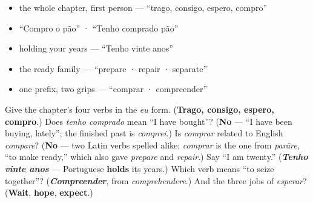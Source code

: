 \begin{itemize}
\raggedright
  \item the whole chapter, first person — \textquotedblleft{}trago, consigo, espero, compro\textquotedblright{}
  \item \textquotedblleft{}Compro o pão\textquotedblright{} · \textquotedblleft{}Tenho comprado pão\textquotedblright{}
  \item holding your years — \textquotedblleft{}Tenho vinte anos\textquotedblright{}
  \item the ready family — \textquotedblleft{}prepare · repair · separate\textquotedblright{}
  \item one prefix, two grips — \textquotedblleft{}comprar · compreender\textquotedblright{}
\end{itemize}

\begin{tcolorbox}[breakable,colback=teal!4,colframe=teal!35!black,title={Before you move on}]
Give the chapter's four verbs in the \emph{eu} form. (\textbf{Trago, consigo, espero, compro}.) Does \emph{tenho comprado} mean \textquotedblleft{}I have bought\textquotedblright{}? (\textbf{No} — \textquotedblleft{}I have been buying, lately\textquotedblright{}; the finished past is \emph{comprei}.) Is \emph{comprar} related to English \emph{compare}? (\textbf{No} — two Latin verbs spelled alike; \emph{comprar} is the one from \emph{parāre}, \textquotedblleft{}to make ready,\textquotedblright{} which also gave \emph{prepare} and \emph{repair}.) Say \textquotedblleft{}I am twenty.\textquotedblright{} (\emph{\textbf{Tenho vinte anos}} — Portuguese \textbf{holds} its years.) Which verb means \textquotedblleft{}to seize together\textquotedblright{}? (\emph{\textbf{Compreender}}, from \emph{comprehendere}.) And the three jobs of \emph{esperar}? (\textbf{Wait}, \textbf{hope}, \textbf{expect}.)
\end{tcolorbox}
